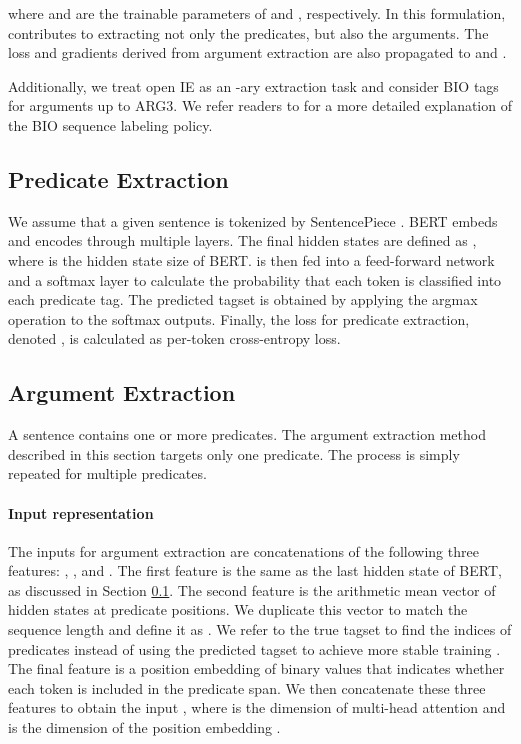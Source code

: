 \documentclass[11pt,a4paper]{article}
\begin{document}
where  and  are the trainable parameters of  and , respectively.
In this formulation,  contributes to extracting not only the predicates, but also the arguments.
The loss and gradients derived from argument extraction are also propagated to  and .

Additionally, we treat open IE as an -ary extraction task and consider BIO tags for arguments up to ARG3. We refer readers to \citet{stanovsky-etal-2018-supervised} for a more detailed explanation of the BIO sequence labeling policy.

\subsection{Predicate Extraction}
\label{sec:predicate_extraction}
We assume that a given sentence  is tokenized by SentencePiece \citep{kudo-richardson-2018-sentencepiece}.
BERT embeds and encodes  through multiple layers. The final hidden states are defined as , where  is the hidden state size of BERT.
 is then fed into a feed-forward network and a softmax layer to calculate the probability that each token is classified into each predicate tag.
The predicted tagset  is obtained by applying the argmax operation to the softmax outputs.
Finally, the loss for predicate extraction, denoted , is calculated as per-token cross-entropy loss.

\subsection{Argument Extraction}
\label{sec:argument_extraction}
A sentence contains one or more predicates.
The argument extraction method described in this section targets only one predicate. The process is simply repeated for multiple predicates.

\paragraph{Input representation}
The inputs for argument extraction are concatenations of the following three features: , , and .
The first feature is the same as the last hidden state of BERT, as discussed in Section \ref{sec:predicate_extraction}.
The second feature is the arithmetic mean vector of hidden states at predicate positions.
We duplicate this vector to match the sequence length  and define it as .
We refer to the true tagset  to find the indices of predicates instead of using the predicted tagset  to achieve more stable training \citep{6795228}.
The final feature  is a position embedding of binary values that indicates whether each token is included in the predicate span.
We then concatenate these three features to obtain the input , where  is the dimension of multi-head attention and  is the dimension of the position embedding .
\end{document}
